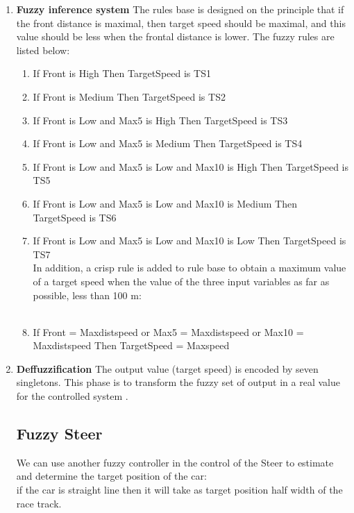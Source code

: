 \documentclass{llncs}
\begin{document}
\begin{enumerate}
	\item{\textbf{Fuzzy inference system}}
	The rules base is designed on the principle that if the front distance is maximal, then target speed should be maximal, and this value should be less when  the frontal distance is lower. The fuzzy rules are listed below:
	\\
	\begin{enumerate}
		
		
		\item If Front is High Then TargetSpeed is TS1
		\item If Front is Medium Then TargetSpeed is TS2
		\item If Front is Low and Max5 is High Then TargetSpeed is TS3
		\item If Front is Low and Max5 is Medium Then TargetSpeed is TS4
		\item If Front is Low and Max5 is Low and Max10 is High Then TargetSpeed is TS5
		\item If Front is Low and Max5 is Low and Max10 is Medium Then TargetSpeed is TS6
		\item  If Front is Low and Max5 is Low and Max10 is Low Then TargetSpeed is TS7
		\\
		In addition, a crisp rule is added to rule base to obtain a maximum value of a target speed when the value of the three input variables as far as possible, less than 100 m: \\\\
		\item If Front = Maxdistspeed or Max5 = Maxdistspeed or Max10 = Maxdistspeed Then TargetSpeed = Maxspeed	
		
	\end{enumerate}
	
	\item{\textbf{Deffuzzification}}
	The output value (target speed) is encoded by seven singletons.
	This phase is to transform the fuzzy set of output in a real value for the controlled system . \\
	
	\subsection{Fuzzy Steer}
	
	We can use another fuzzy controller in the control of the Steer to estimate and determine the target position of the car:\\
	if the car is straight line then it will take as target position half width of the race track.\\
	

\end{enumerate}
\end{document}
